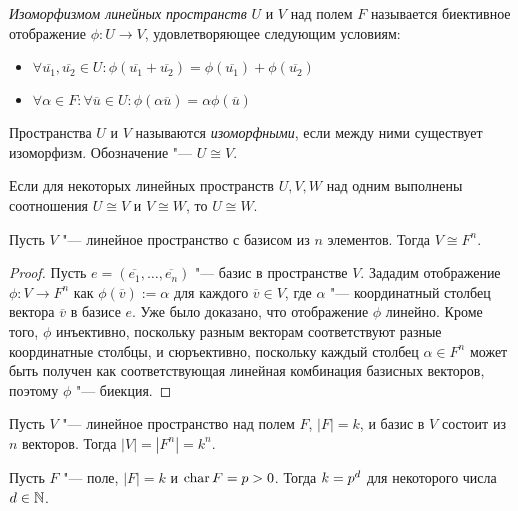 \begin{definition}
	\textit{Изоморфизмом линейных пространств} $U$ и $V$ над полем $F$ называется биективное отображение $\phi : U \rightarrow V$, удовлетворяющее следующим условиям:
	\begin{itemize}
		\item $\forall \overline{u_1}, \overline{u_2} \in U: \phi(\overline{u_1} + \overline{u_2}) = \phi(\overline{u_1}) + \phi(\overline{u_2})$
		\item $\forall \alpha \in F: \forall \overline u \in U: \phi(\alpha\overline{u}) = \alpha\phi(\overline{u})$
	\end{itemize}

	Пространства $U$ и $V$ называются \textit{изоморфными}, если между ними существует изоморфизм. Обозначение "--- $U \cong V$.
\end{definition}

\begin{note}
	Если для некоторых линейных пространств $U, V, W$ над одним выполнены соотношения $U \cong V$ и $V \cong W$, то $U \cong W$.
\end{note}

\begin{proposition}
	Пусть $V$ "--- линейное пространство с базисом из $n$ элементов. Тогда $V \cong F^n$.
\end{proposition}

\begin{proof}
	Пусть $e = (\overline{e_1}, \dots, \overline{e_n})$ "--- базис в пространстве $V$. Зададим отображение $\phi: V \rightarrow F^n$ как $\phi(\overline{v}) := \alpha$ для каждого $\overline{v} \in V$, где $\alpha$ "--- координатный столбец вектора $\overline v$ в базисе $e$. Уже было доказано, что отображение $\phi$ линейно. Кроме того, $\phi$ инъективно, поскольку разным векторам соответствуют разные координатные столбцы, и сюръективно, поскольку каждый столбец $\alpha \in F^n$ может быть получен как соответствующая линейная комбинация базисных векторов, поэтому $\phi$ "--- биекция.
\end{proof}

\begin{corollary}
	Пусть $V$ "--- линейное пространство над полем $F$, $|F| = k$, и базис в $V$ состоит из $n$ векторов. Тогда $|V| = |F^n| = k^n$.
\end{corollary}

\begin{corollary}
	Пусть $F$ "--- поле, $|F| = k$ и $\operatorname{char}{F} = p > 0$. Тогда $k \hm{=} p^d$ для некоторого числа $d \in \mathbb{N}$.
\end{corollary}

